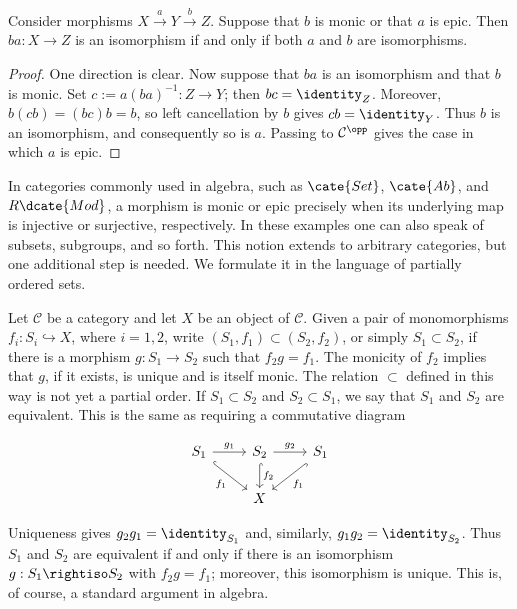\begin{proposition}\label{prop:epi-mono-isomorphism}
	Consider morphisms $X\xrightarrow{a}Y\xrightarrow{b}Z$. Suppose that $b$
	is monic or that $a$ is epic. Then $ba:X\to Z$ is an isomorphism if and
	only if both $a$ and $b$ are isomorphisms.
\end{proposition}

\begin{proof}
	One direction is clear. Now suppose that $ba$ is an isomorphism and that
	$b$ is monic. Set $c:=a(ba)^{-1}:Z\to Y$; then $bc=\identity_Z$.
	Moreover, $b(cb)=(bc)b=b$, so left cancellation by $b$ gives
	$cb=\identity_Y$. Thus $b$ is an isomorphism, and consequently so is $a$.
	Passing to $\mathcal C^{\opp}$ gives the case in which $a$ is epic.
\end{proof}

In categories commonly used in algebra, such as $\cate{Set}$, $\cate{Ab}$,
and $R\dcate{Mod}$, a morphism is monic or epic precisely when its underlying
map is injective or surjective, respectively. In these examples one can also
speak of subsets, subgroups, and so forth. This notion extends to arbitrary
categories, but one additional step is needed. We formulate it in the language
of partially ordered sets.

Let $\mathcal C$ be a category and let $X$ be an object of $\mathcal C$.
Given a pair of monomorphisms $f_i:S_i\hookrightarrow X$, where $i=1,2$,
write $(S_1,f_1)\subset(S_2,f_2)$, or simply $S_1\subset S_2$, if there is
a morphism $g:S_1\to S_2$ such that $f_2g=f_1$. The monicity of $f_2$ implies
that $g$, if it exists, is unique and is itself monic. The relation $\subset$
defined in this way is not yet a partial order. If $S_1\subset S_2$ and
$S_2\subset S_1$, we say that $S_1$ and $S_2$ are equivalent. This is the
same as requiring a commutative diagram

\[\begin{tikzcd}
	S_1 \arrow[r, "g_1"] \arrow[hookrightarrow, rd, "f_1"'] & S_2 \arrow[hookrightarrow, d, "f_2"] \arrow[r, "g_2"] & S_1 \arrow[hookrightarrow, ld, "f_1"] \\
	& X &
\end{tikzcd}\]

Uniqueness gives $g_2g_1=\identity_{S_1}$ and, similarly,
$g_1g_2=\identity_{S_2}$. Thus $S_1$ and $S_2$ are equivalent if and only if
there is an isomorphism $g:S_1\rightiso S_2$ with $f_2g=f_1$; moreover, this
isomorphism is unique. This is, of course, a standard argument in algebra.

